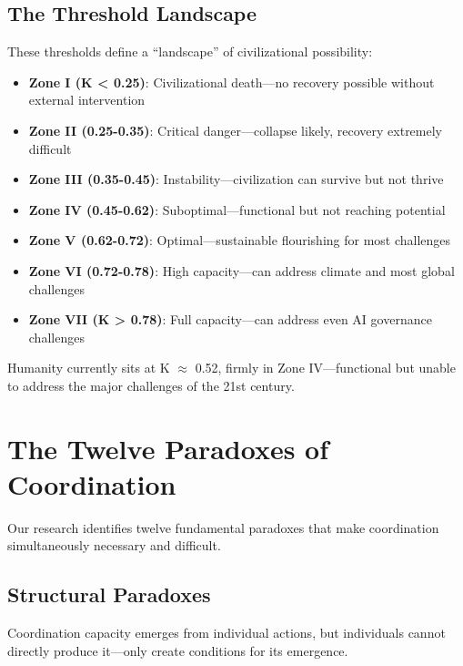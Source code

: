 \documentclass[12pt,letterpaper]{article}
\begin{document}
\subsection{The Threshold Landscape}

These thresholds define a ``landscape'' of civilizational possibility:

\begin{itemize}
    \item \textbf{Zone I (K < 0.25)}: Civilizational death---no recovery possible without external intervention
    \item \textbf{Zone II (0.25-0.35)}: Critical danger---collapse likely, recovery extremely difficult
    \item \textbf{Zone III (0.35-0.45)}: Instability---civilization can survive but not thrive
    \item \textbf{Zone IV (0.45-0.62)}: Suboptimal---functional but not reaching potential
    \item \textbf{Zone V (0.62-0.72)}: Optimal---sustainable flourishing for most challenges
    \item \textbf{Zone VI (0.72-0.78)}: High capacity---can address climate and most global challenges
    \item \textbf{Zone VII (K > 0.78)}: Full capacity---can address even AI governance challenges
\end{itemize}

Humanity currently sits at K $\approx$ 0.52, firmly in Zone IV---functional but unable to address the major challenges of the 21st century.

\section{The Twelve Paradoxes of Coordination}

Our research identifies twelve fundamental paradoxes that make coordination simultaneously necessary and difficult.

\subsection{Structural Paradoxes}

\begin{theorembox}
Coordination capacity emerges from individual actions, but individuals cannot directly produce it---only create conditions for its emergence.
\end{theorembox}
\end{document}
